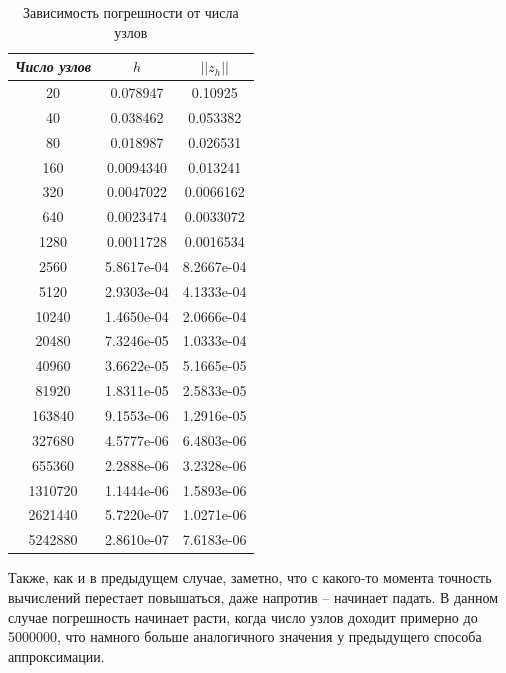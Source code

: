 \documentclass[12pt]{article}
\begin{document}
\begin{table}[H]
\caption{Зависимость погрешности от числа узлов}
\begin{center}
\begin{tabular}{|c|c|c|}
\hline
\textit{Число узлов} &$ h$ & $||z_h||$  \\
\hline
20 & 0.078947 & 0.10925 \\
\hline
40 & 0.038462 & 0.053382 \\
\hline
80 & 0.018987 & 0.026531 \\
\hline
160 & 0.0094340 & 0.013241\\
\hline
320 & 0.0047022 & 0.0066162 \\
\hline
640 & 0.0023474 & 0.0033072 \\
\hline
1280 & 0.0011728 &  0.0016534\\
\hline
2560 & 5.8617e-04 & 8.2667e-04 \\
\hline
5120 & 2.9303e-04 & 4.1333e-04 \\
\hline
10240 & 1.4650e-04 & 2.0666e-04 \\
\hline
20480 & 7.3246e-05 & 1.0333e-04 \\
\hline
40960 & 3.6622e-05 & 5.1665e-05 \\
\hline
81920 & 1.8311e-05 & 2.5833e-05 \\
\hline
163840 & 9.1553e-06 & 1.2916e-05 \\
\hline
327680 & 4.5777e-06 & 6.4803e-06 \\
\hline
655360 & 2.2888e-06 & 3.2328e-06 \\
\hline
1310720 & 1.1444e-06 & 1.5893e-06 \\
\hline
2621440 & 5.7220e-07 & 1.0271e-06 \\
\hline
5242880 & 2.8610e-07 & 7.6183e-06 \\
\hline
\end{tabular}
\end{center}
\end{table}

Также, как и в предыдущем случае, заметно, что с какого-то момента точность вычислений перестает повышаться, даже напротив – начинает падать. В данном случае погрешность начинает расти, когда число узлов доходит примерно до 5000000, что намного больше аналогичного значения у предыдущего способа аппроксимации.
\end{document}
